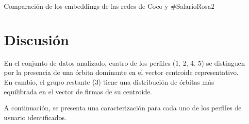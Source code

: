 \begin{table}[h]
    \begin{center}
        \caption{Comparación de los embeddings de las redes de Coco y \#SalarioRosa2}
    \end{center}
\end{table}


\section{Discusión}
En el conjunto de datos analizado, cuatro de los perfiles (1, 2, 4, 5) se distinguen por la presencia de una órbita dominante en el vector centroide representativo. En cambio, el grupo restante (3) tiene una distribución de órbitas más equilibrada en el vector de firmas de su centroide.

A continuación, se presenta una caracterización para cada uno de los perfiles de usuario identificados.  

